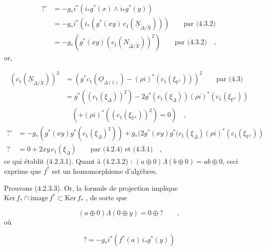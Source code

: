 
\begin{equation*}
\begin{aligned}
?' &= -g_*i^*(i_*g^*(x) \wedge i_*g^*(y)) \\
&= -g_*i^*(i_*(g^*(xy)\, c_1(\underline{N}_{\widetilde{\Delta}/\widetilde{X}}))) \qquad \text{par (4.3.2)} \\
&= -g_*(g^*(xy)(c_1(N_{\widetilde{\Delta}/\widetilde{X}}))^2) \qquad \text{par (4.3.2)} \quad ,
\end{aligned}
\end{equation*}
or,

\begin{equation*}
\begin{aligned}
(c_1(\underline{N}_{\widetilde{\Delta}/\widetilde{X}}))^2 &= (g^*c_1(\underline{O}_{\Delta(1)}) - (\rho i)^* (c_1(\xi_{\mathbb{P}^1})))^2 \qquad \text{par (4.3)} \\
&= g^*((c_1(\xi_\Delta))^2) - 2g^*(c_1(\xi_\Delta))(\rho i)^*(c_1(\xi_{\mathbb{P}^1})) \\
&\quad ( + (\rho i)^* ((c_1( \xi_{\mathbb{P}^1}))^2) = 0 ) \quad ,
\end{aligned}
\end{equation*}
\begin{equation*}
\begin{aligned}
?' &= - g_*(g^*(xy)g^*(c_1(\xi_\Delta)^2)) + g_*(2g^*(xy)g^*(c_1(\xi_\Delta)(\rho i)^*(c_1(\xi_{\mathbb{P}^1})) \\
? &= 0 + 2xy\, c_1(\xi_\Delta) \qquad \text{par (4.2.4) et (4.3.1)} \quad ,
\end{aligned}
\end{equation*}
ce qui établit (4.2.3.1). Quant à (4.2.3.2) : $(a \oplus 0) \Lambda (b \oplus 0) = ab \oplus 0$, ceci exprime que $f^*$ est un homomorphisme d'algèbres.

Prouvons (4.2.3.3). Or, la formule de projection implique $\mathrm{Ker}\, f_* \cap \mathrm{image}\, f^* \subset \mathrm{Ker}\, f_*$ , de sorte que

\begin{equation*}
(a \oplus 0) \Lambda (0 \oplus y) = 0 \oplus ? \qquad ,
\end{equation*}
où

\begin{equation}\tag{4.3.3}
? = - g_*i^*(f^*(a)\, i_*g^*(y)) 
\end{equation}


